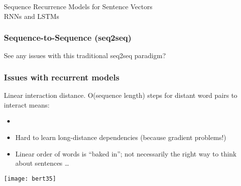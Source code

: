 \begin{frame}[fragile]\frametitle{}
\begin{center}
{\Large Sequence Recurrence Models for Sentence Vectors\\ \small RNNs and LSTMs}
\end{center}
\end{frame}

\begin{frame}[fragile]\frametitle{Sequence-to-Sequence (seq2seq)}

\begin{center}
See any issues with this traditional seq2seq paradigm?
\end{center}	

\end{frame}

\begin{frame}[fragile]\frametitle{Issues with recurrent models}


Linear interaction distance. O(sequence length) steps for distant word pairs to interact means:

\begin{itemize}
\item 

\item Hard to learn long-distance dependencies (because gradient problems!)
\item Linear order of words is ``baked in''; not necessarily the  right way to think about sentences \ldots
\end{itemize}	 

\begin{center}
\texttt{[image: bert35]}
\end{center}	

 
\end{frame}

